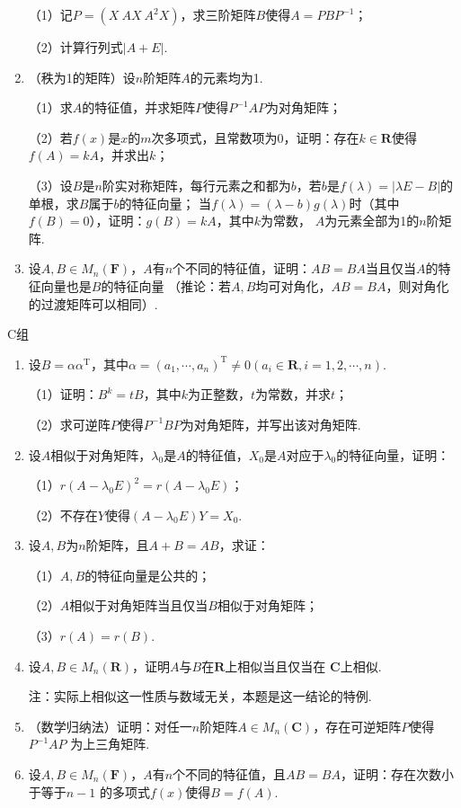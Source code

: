 \begin{enumerate}
	（1）记$P=(X\ AX\ A^2X)$，求三阶矩阵$B$使得$A=PBP^{-1}$；

	（2）计算行列式$|A+E|$.
	\item （秩为1的矩阵）设$n$阶矩阵$A$的元素均为1.
	
	（1）求$A$的特征值，并求矩阵$P$使得$P^{-1}AP$为对角矩阵；

	（2）若$f(x)$是$x$的$m$次多项式，且常数项为0，证明：存在$k\in\mathbf{R}$使得$f(A)=kA$，并求出$k$；

	（3）设$B$是$n$阶实对称矩阵，每行元素之和都为$b$，若$b$是$f(\lambda)=|\lambda E-B|$的单根，求$B$属于$b$的特征向量；
	当$f(\lambda)=(\lambda-b)g(\lambda)$时（其中$f(B)=0$），证明：$g(B)=kA$，其中$k$为常数，
	$A$为元素全部为1的$n$阶矩阵.
	\item 设$A,B\in M_n(\mathbf{F})$，$A$有$n$个不同的特征值，证明：$AB=BA$当且仅当$A$的特征向量也是$B$的特征向量
	（推论：若$A,B$均可对角化，$AB=BA$，则对角化的过渡矩阵可以相同）.
\end{enumerate}
\centerline{\heiti C组}
\begin{enumerate}
	\item 设$B=\alpha\alpha^\mathrm{T}$，其中$\alpha=(a_1,\cdots,a_n)^\mathrm{T}\neq 0(a_i\in\mathbf{R},i=1,2,\cdots,n)$.
	
	（1）证明：$B^k=tB$，其中$k$为正整数，$t$为常数，并求$t$；

	（2）求可逆阵$P$使得$P^{-1}BP$为对角矩阵，并写出该对角矩阵.
	\item 设$A$相似于对角矩阵，$\lambda_0$是$A$的特征值，$X_0$是$A$对应于$\lambda_0$的特征向量，证明：
	
	（1）$r(A-\lambda_0 E)^2=r(A-\lambda_0 E)$；

	（2）不存在$Y$使得$(A-\lambda_0 E)Y=X_0$.
	\item 设$A,B$为$n$阶矩阵，且$A+B=AB$，求证：
	
	（1）$A,B$的特征向量是公共的；

	（2）$A$相似于对角矩阵当且仅当$B$相似于对角矩阵；

	（3）$r(A)=r(B)$.
	\item 设$A,B\in M_n(\mathbf{R})$，证明$A$与$B$在$\mathbf{R}$上相似当且仅当在
	$\mathbf{C}$上相似.

	注：实际上相似这一性质与数域无关，本题是这一结论的特例.
	\item （数学归纳法）证明：对任一$n$阶矩阵$A\in M_n(\mathbf{C})$，存在可逆矩阵$P$使得$P^{-1}AP$
	为上三角矩阵.
	\item 设$A,B\in M_n(\mathbf{F})$，$A$有$n$个不同的特征值，且$AB=BA$，证明：存在次数小于等于$n-1$
	的多项式$f(x)$使得$B=f(A)$.
\end{enumerate}

